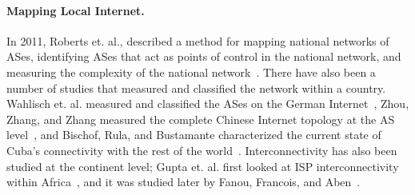 \paragraph{Mapping Local Internet.}  In 2011, Roberts et. al., described a method for mapping national networks of ASes, identifying ASes that act as points of control in the national network, and measuring the complexity of the national network~\cite{roberts2011mapping}.  There have also been a number of studies that measured and classified the network within a country.  Wahlisch et. al. measured and classified the ASes on the German Internet~\cite{wahlisch2010framework, wahlisch2012exposing}, Zhou, Zhang, and Zhang measured the complete Chinese Internet topology at the AS level~\cite{zhou2007chinese}, and Bischof, Rula, and Bustamante characterized the current state of Cuba's connectivity with the rest of the world~\cite{bischof2015and}.  Interconnectivity has also been studied at the continent level; Gupta et. al. first looked at ISP interconnectivity within Africa~\cite{gupta2014peering}, and it was studied later by Fanou, Francois, and Aben~\cite{fanou2015diversity}.
